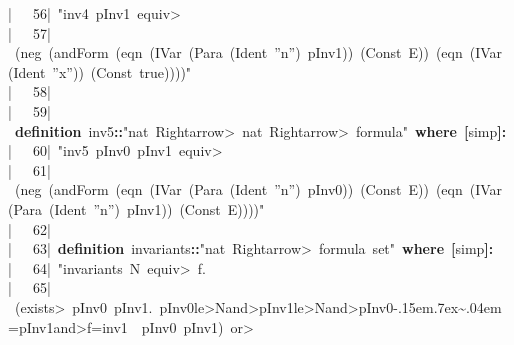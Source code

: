 \documentclass{article}
\newcommand{\syntaxKEYWORDA}[1]{\textcolor[rgb]{0.0,0.4,0.6}{\textbf{#1}}}
\newcommand{\syntaxKEYWORDB}[1]{\textcolor[rgb]{0.0,0.6,0.4}{\textbf{#1}}}
\newcommand{\syntaxLITERALA}[1]{\textcolor[rgb]{1.0,0.0,0.8}{#1}}
\newcommand{\syntaxOPERATOR}[1]{\textcolor[rgb]{0.0,0.0,0.0}{\textbf{#1}}}
\newcommand{\syntaxKEYWORDA}[1]{\textcolor[rgb]{0.0,0.4,0.6}{\textbf{#1}}}
\newcommand{\syntaxKEYWORDB}[1]{\textcolor[rgb]{0.0,0.6,0.4}{\textbf{#1}}}
\newcommand{\syntaxLITERALA}[1]{\textcolor[rgb]{1.0,0.0,0.8}{#1}}
\newcommand{\syntaxOPERATOR}[1]{\textcolor[rgb]{0.0,0.0,0.0}{\textbf{#1}}}
\newcommand{\syntaxKEYWORDA}[1]{\textcolor[rgb]{0.0,0.4,0.6}{\textbf{#1}}}
\newcommand{\syntaxKEYWORDB}[1]{\textcolor[rgb]{0.0,0.6,0.4}{\textbf{#1}}}
\newcommand{\syntaxLITERALA}[1]{\textcolor[rgb]{1.0,0.0,0.8}{#1}}
\newcommand{\syntaxOPERATOR}[1]{\textcolor[rgb]{0.0,0.0,0.0}{\textbf{#1}}}
\newcommand{\syntaxKEYWORDA}[1]{\textcolor[rgb]{0.0,0.4,0.6}{#1}}
\newcommand{\syntaxKEYWORDB}[1]{\textcolor[rgb]{0.0,0.6,0.4}{#1}}
\newcommand{\syntaxLITERALA}[1]{\textcolor[rgb]{1.0,0.0,0.8}{\textbf{#1}}}
\newcommand{\syntaxOPERATOR}[1]{\textcolor[rgb]{0.0,0.0,0.0}{#1}}
\newcommand{\syntaxKEYWORDA}[1]{\textcolor[rgb]{0.0,0.4,0.6}{#1}}
\newcommand{\syntaxKEYWORDB}[1]{\textcolor[rgb]{0.0,0.6,0.4}{#1}}
\newcommand{\syntaxLITERALA}[1]{\textcolor[rgb]{1.0,0.0,0.8}{#1}}
\newcommand{\syntaxOPERATOR}[1]{\textcolor[rgb]{0.0,0.0,0.0}{#1}}
\newcommand{\syntaxKEYWORDA}[1]{\textcolor[rgb]{0.0,0.4,0.6}{\textbf{#1}}}
\newcommand{\syntaxKEYWORDB}[1]{\textcolor[rgb]{0.0,0.6,0.4}{\textbf{#1}}}
\newcommand{\syntaxLITERALA}[1]{\textcolor[rgb]{1.0,0.0,0.8}{#1}}
\newcommand{\syntaxOPERATOR}[1]{\textcolor[rgb]{0.0,0.0,0.0}{\textbf{#1}}}
\newcommand{\gutter}[1]{\textcolor[rgb]{0,0,0}{{|}#1}}
\newcommand{\gutterH}[1]{\textcolor[rgb]{1,0,0}{{|}#1}}
\def\urltilda{\kern -.15em\lower .7ex\hbox{\~{}}\kern .04em}
\begin{document}
\gutter{\ \ \ 56{|}\ }\syntaxLITERALA{"inv\usebox{\underscorebox}\usebox{\underscorebox}4{\ }p\usebox{\underscorebox}\usebox{\underscorebox}Inv1{\ }\<equiv>}\hspace*{\fill}\\
\gutter{\ \ \ 57{|}\ }\syntaxLITERALA{(neg{\ }(andForm{\ }(eqn{\ }(IVar{\ }(Para{\ }(Ident{\ }''n''){\ }p\usebox{\underscorebox}\usebox{\underscorebox}Inv1)){\ }(Const{\ }E)){\ }(eqn{\ }(IVar{\ }(Ident{\ }''x'')){\ }(Const{\ }true))))"}\hspace*{\fill}\\
\gutter{\ \ \ 58{|}\ }\hspace*{\fill}\\
\gutter{\ \ \ 59{|}\ }\syntaxKEYWORDA{definition}{\ }inv\usebox{\underscorebox}\usebox{\underscorebox}5\syntaxOPERATOR{::}\syntaxLITERALA{"nat{\ }\<Rightarrow>{\ }nat{\ }\<Rightarrow>{\ }formula"}{\ }\syntaxKEYWORDB{where}{\ }\syntaxOPERATOR{{[}}simp\syntaxOPERATOR{{]}}\syntaxOPERATOR{:}\hspace*{\fill}\\
\gutterH{\ \ \ 60{|}\ }\syntaxLITERALA{"inv\usebox{\underscorebox}\usebox{\underscorebox}5{\ }p\usebox{\underscorebox}\usebox{\underscorebox}Inv0{\ }p\usebox{\underscorebox}\usebox{\underscorebox}Inv1{\ }\<equiv>}\hspace*{\fill}\\
\gutter{\ \ \ 61{|}\ }\syntaxLITERALA{(neg{\ }(andForm{\ }(eqn{\ }(IVar{\ }(Para{\ }(Ident{\ }''n''){\ }p\usebox{\underscorebox}\usebox{\underscorebox}Inv0)){\ }(Const{\ }E)){\ }(eqn{\ }(IVar{\ }(Para{\ }(Ident{\ }''n''){\ }p\usebox{\underscorebox}\usebox{\underscorebox}Inv1)){\ }(Const{\ }E))))"}\hspace*{\fill}\\
\gutter{\ \ \ 62{|}\ }\hspace*{\fill}\\
\gutter{\ \ \ 63{|}\ }\syntaxKEYWORDA{definition}{\ }invariants\syntaxOPERATOR{::}\syntaxLITERALA{"nat{\ }\<Rightarrow>{\ }formula{\ }set"}{\ }\syntaxKEYWORDB{where}{\ }\syntaxOPERATOR{{[}}simp\syntaxOPERATOR{{]}}\syntaxOPERATOR{:}\hspace*{\fill}\\
\gutter{\ \ \ 64{|}\ }\syntaxLITERALA{"invariants{\ }N{\ }\<equiv>{\ }\usebox{\opencurlybracket}f.}\hspace*{\fill}\\
\gutterH{\ \ \ 65{|}\ }\syntaxLITERALA{(\<exists>{\ }p\usebox{\underscorebox}\usebox{\underscorebox}Inv0{\ }p\usebox{\underscorebox}\usebox{\underscorebox}Inv1.{\ }p\usebox{\underscorebox}\usebox{\underscorebox}Inv0\<le>N\<and>p\usebox{\underscorebox}\usebox{\underscorebox}Inv1\<le>N\<and>p\usebox{\underscorebox}\usebox{\underscorebox}Inv0\urltilda=p\usebox{\underscorebox}\usebox{\underscorebox}Inv1\<and>f=inv\usebox{\underscorebox}\usebox{\underscorebox}1{\ }{\ }p\usebox{\underscorebox}\usebox{\underscorebox}Inv0{\ }p\usebox{\underscorebox}\usebox{\underscorebox}Inv1){\ }\<or>}\hspace*{\fill}\\
\end{document}
